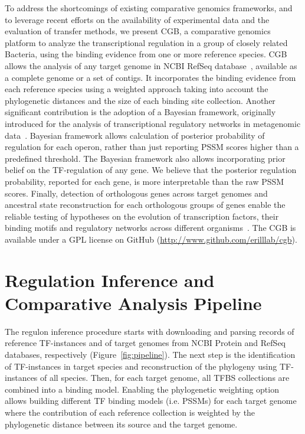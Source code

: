 \documentclass[12pt]{article}
\begin{document}
To address the shortcomings of existing comparative genomics frameworks, and to
leverage recent efforts on the availability of experimental data and the
evaluation of transfer methods, we present CGB, a comparative genomics platform
to analyze the transcriptional regulation in a group of closely related
Bacteria, using the binding evidence from one or more reference species. CGB
allows the analysis of any target genome in NCBI RefSeq
database~\cite{o2015reference}, available as a complete genome or a set of
contigs. It incorporates the binding evidence from each reference species using
a weighted approach taking into account the phylogenetic distances and the size
of each binding site collection. Another significant contribution is the
adoption of a Bayesian framework, originally introduced for the analysis of
transcriptional regulatory networks in metagenomic
data~\cite{hobbs2016bayesian}. Bayesian framework allows calculation of
posterior probability of regulation for each operon, rather than just reporting
PSSM scores higher than a predefined threshold. The Bayesian framework also
allows incorporating prior belief on the TF-regulation of any gene. We believe
that the posterior regulation probability, reported for each gene, is more
interpretable than the raw PSSM scores. Finally, detection of orthologous genes
across target genomes and ancestral state reconstruction for each orthologous
groups of genes enable the reliable testing of hypotheses on the evolution of
transcription factors, their binding motifs and regulatory networks across
different organisms~\cite{pagel1999inferring}. The CGB is available under a GPL
license on GitHub (\url{http://www.github.com/erilllab/cgb}).

\section{Regulation Inference and Comparative Analysis Pipeline}

The regulon inference procedure starts with downloading and parsing records of
reference TF-instances and of target genomes from NCBI Protein and RefSeq
databases, respectively (Figure~\ref{fig:pipeline}). The next step is the
identification of TF-instances in target species and reconstruction of the
phylogeny using TF-instances of all species. Then, for each target genome, all
TFBS collections are combined into a binding model. Enabling the phylogenetic
weighting option allows building different TF binding models (i.e. PSSMs) for
each target genome where the contribution of each reference collection is
weighted by the phylogenetic distance between its source and the target genome.
\end{document}
